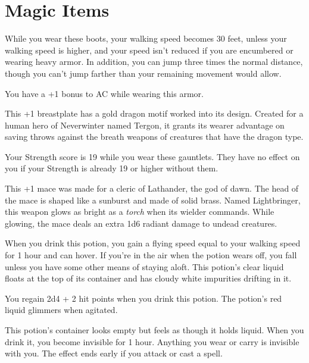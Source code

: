 \documentclass[10pt,a4paper,twoside,bg=print,twocolumn,openany,nodeprecatedcode]{dndbook}
\begin{document}
\chapter{Magic Items}
While you wear these boots, your walking speed becomes 30 feet, unless your walking speed is higher, and your speed isn't reduced if you are encumbered or wearing heavy armor. In addition, you can jump three times the normal distance, though you can't jump farther than your remaining movement would allow.

You have a +1 bonus to AC while wearing this armor.

This +1 breastplate has a gold dragon motif worked into its design. Created for a human hero of Neverwinter named Tergon, it grants its wearer advantage on saving throws against the breath weapons of creatures that have the dragon type.

Your Strength score is 19 while you wear these gauntlets. They have no effect on you if your Strength is already 19 or higher without them.

This +1 mace was made for a cleric of Lathander, the god of dawn. The head of the mace is shaped like a sunburst and made of solid brass. Named Lightbringer, this weapon glows as bright as a \textit{torch} when its wielder commands. While glowing, the mace deals an extra 1d6 radiant damage to undead creatures.

When you drink this potion, you gain a flying speed equal to your walking speed for 1 hour and can hover. If you're in the air when the potion wears off, you fall unless you have some other means of staying aloft. This potion's clear liquid floats at the top of its container and has cloudy white impurities drifting in it.

You regain 2d4 + 2 hit points when you drink this potion. The potion's red liquid glimmers when agitated.

This potion's container looks empty but feels as though it holds liquid. When you drink it, you become invisible for 1 hour. Anything you wear or carry is invisible with you. The effect ends early if you attack or cast a spell.
\end{document}
